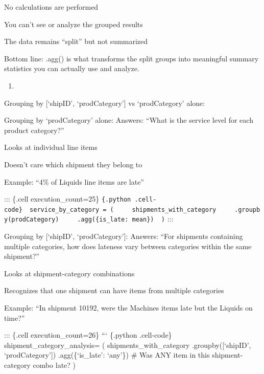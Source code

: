 \documentclass[
  letterpaper,
  DIV=11,
  numbers=noendperiod]{scrartcl}
\providecommand{\tightlist}{%
  \setlength{\itemsep}{0pt}\setlength{\parskip}{0pt}}
\begin{document}
No calculations are performed

You can't see or analyze the grouped results

The data remains ``split'' but not summarized

Bottom line: .agg() is what transforms the split groups into meaningful
summary statistics you can actually use and analyze.

\begin{enumerate}
\def\labelenumi{\arabic{enumi}.}
\setcounter{enumi}{1}
\tightlist
\item
\end{enumerate}

Grouping by {[}`shipID', `prodCategory'{]} vs `prodCategory' alone:

Grouping by `prodCategory' alone: Answers: ``What is the service level
for each product category?''

Looks at individual line items

Doesn't care which shipment they belong to

Example: ``4\% of Liquids line items are late''

::: \{.cell execution\_count=25\}
\texttt{\{.python\ .cell-code\}\ \ service\_by\_category\ =\ (\ \ \ \ \ shipments\_with\_category\ \ \ \ \ .groupby(\textquotesingle{}prodCategory\textquotesingle{})\ \ \ \ \ .agg(\{\textquotesingle{}is\_late\textquotesingle{}:\ \textquotesingle{}mean\textquotesingle{}\})\ \ )}
:::

Grouping by {[}`shipID', `prodCategory'{]}: Answers: ``For shipments
containing multiple categories, how does lateness vary between
categories within the same shipment?''

Looks at shipment-category combinations

Recognizes that one shipment can have items from multiple categories

Example: ``In shipment 10192, were the Machines items late but the
Liquids on time?''

::: \{.cell execution\_count=26\} ``` \{.python .cell-code\}
shipment\_category\_analysis= ( shipments\_with\_category
.groupby({[}`shipID', `prodCategory'{]}) .agg(\{`is\_late': `any'\}) \#
Was ANY item in this shipment-category combo late? )
\end{document}
